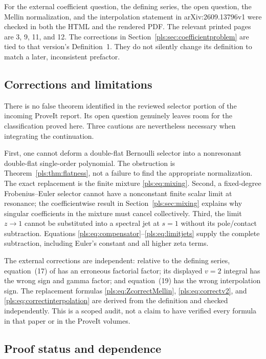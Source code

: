 \documentclass[11pt,letterpaper]{article}
\numberwithin{equation}{section}
\theoremstyle{definition}
\theoremstyle{remark}\newtheorem{remark}[theorem]{Remark}
\begin{document}
For the external coefficient question, the defining series, the open
question, the Mellin normalization, and the interpolation statement in
arXiv:2609.13796v1 were checked in both the HTML and the rendered PDF.
The relevant printed pages are 3, 9, 11, and 12. The corrections in
Section~\ref{pls:sec:coefficientproblem} are tied to that version's
Definition~1. They do not silently change its definition to match a
later, inconsistent prefactor.

\subsection{Corrections and limitations}

There is no false theorem identified in the reviewed selector portion
of the incoming ProveIt report. Its open question genuinely leaves room
for the classification proved here. Three cautions are nevertheless
necessary when integrating the continuation.

First, one cannot deform a double-flat Bernoulli selector into a
nonresonant double-flat single-order polynomial. The obstruction is
Theorem~\ref{pls:thm:flatness}, not a failure to find the appropriate
normalization. The exact replacement is the finite mixture
\eqref{pls:eq:mixing}. Second, a fixed-degree Frobenius--Euler selector
cannot have a nonconstant finite scalar limit at resonance; the
coefficientwise result in Section~\ref{pls:sec:mixing} explains why
singular coefficients in the mixture must cancel collectively. Third,
the limit $z\to1$ cannot be substituted into a spectral jet at $s=1$
without its pole/contact subtraction. Equations
\eqref{pls:eq:compensator}--\eqref{pls:eq:limitjets} supply the complete
subtraction, including Euler's constant and all higher zeta terms.

The external corrections are independent: relative to the defining
series, equation~(17) of \cite{PPS} has an erroneous factorial factor;
its displayed $v=2$ integral has the wrong sign and gamma factor; and
equation~(19) has the wrong interpolation sign. The replacement formulas
\eqref{pls:eq:ZcorrectMellin}, \eqref{pls:eq:correctv2}, and
\eqref{pls:eq:correctinterpolation} are derived from the definition and
checked independently. This is a scoped audit, not a claim to have
verified every formula in that paper or in the ProveIt volumes.

\subsection{Proof status and dependence}
\end{document}
